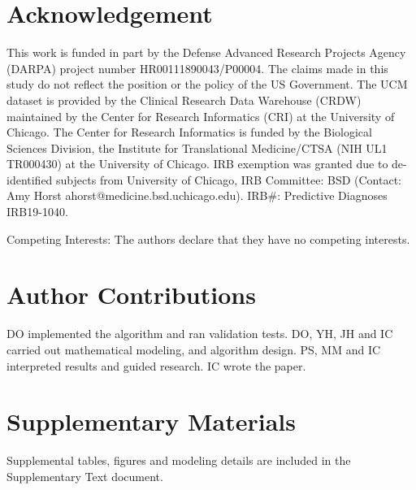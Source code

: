 \documentclass[onecolumn,,10pt]{IEEEtran}
\begin{document}
\section*{Acknowledgement}
This work is funded in part by the Defense Advanced Research Projects Agency (DARPA) project number  HR00111890043/P00004. The claims made in this study  do not  reflect the position or the policy of the US Government. The UCM dataset is provided by the Clinical Research Data Warehouse (CRDW) maintained by the Center for Research Informatics (CRI) at the  University of Chicago. The Center for Research Informatics is funded by the Biological Sciences Division, the Institute for Translational Medicine/CTSA (NIH UL1 TR000430) at the University of Chicago. IRB exemption was granted due to de-identified subjects from University of Chicago, IRB Committee: BSD (Contact: Amy Horst
ahorst@medicine.bsd.uchicago.edu). IRB\#: Predictive Diagnoses IRB19-1040.

Competing Interests: The authors declare that they have no competing interests.

\section*{Author Contributions}
DO implemented the algorithm and ran validation tests. DO, YH, JH and IC carried out mathematical modeling, and  algorithm design. PS, MM and IC interpreted results and guided research.
IC wrote the paper.

\section*{Supplementary Materials} Supplemental tables, figures and modeling details are included in the Supplementary Text document.


\nocite{*}

\end{document}
